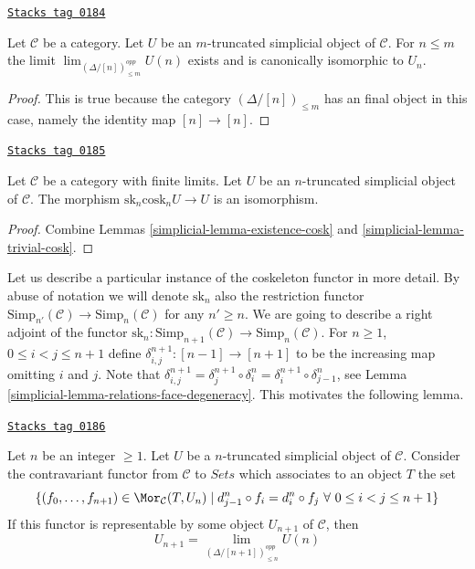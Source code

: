 \begin{lemma}
\label{simplicial-lemma-trivial-cosk}
\href{https://stacks.math.columbia.edu/tag/0184}{\texttt{Stacks tag 0184}}

Let $\mathcal{C}$ be a category.
Let $U$ be an $m$-truncated simplicial object of $\mathcal{C}$.
For $n \leq m$ the limit $\lim_{(\Delta/[n])_{\leq m}^{opp}} U(n)$
exists and is canonically isomorphic to $U_n$.
\end{lemma}

\begin{proof}
This is true because the category $(\Delta/[n])_{\leq m}$
has an final object in this case, namely the identity
map $[n] \to [n]$.
\end{proof}

\begin{lemma}
\label{simplicial-lemma-recover-cosk}
\href{https://stacks.math.columbia.edu/tag/0185}{\texttt{Stacks tag 0185}}

Let $\mathcal{C}$ be a category with finite limits.
Let $U$ be an $n$-truncated simplicial object of $\mathcal{C}$.
The morphism $\text{sk}_n \text{cosk}_n U \to U$
is an isomorphism.
\end{lemma}

\begin{proof}

Combine Lemmas \ref{simplicial-lemma-existence-cosk} and \ref{simplicial-lemma-trivial-cosk}.
\end{proof}

Let us describe a particular instance of the coskeleton functor in more detail.
By abuse of notation we will denote $\text{sk}_n$
also the restriction functor
$\text{Simp}_{n'}(\mathcal{C}) \to \text{Simp}_n(\mathcal{C})$
for any $n' \geq n$. We are going to describe a right adjoint
of the functor
$\text{sk}_n : \text{Simp}_{n + 1}(\mathcal{C})
\to \text{Simp}_n(\mathcal{C})$.
For $n \geq 1$, $0 \leq i < j \leq n + 1$
define $\delta^{n + 1}_{i, j} : [n - 1] \to [n + 1]$
to be the increasing map omitting $i$ and $j$.
Note that
$\delta^{n + 1}_{i, j} =
\delta^{n + 1}_j \circ \delta^n_i =
\delta^{n + 1}_i \circ \delta^n_{j - 1}$, see
Lemma \ref{simplicial-lemma-relations-face-degeneracy}. This motivates
the following lemma.

\begin{lemma}
\label{simplicial-lemma-formula-limit}
\href{https://stacks.math.columbia.edu/tag/0186}{\texttt{Stacks tag 0186}}

Let $n$ be an integer $\geq 1$.
Let $U$ be a $n$-truncated simplicial object of $\mathcal{C}$.
Consider the contravariant functor from $\mathcal{C}$ to
$\textit{Sets}$ which associates to an object $T$ the set
$$
\{ (f_0, \ldots, f_{n + 1}) \in \Mor_\mathcal{C}(T, U_n)
\mid
d^n_{j - 1} \circ f_i = d^n_i \circ f_j
\ \forall\ 0\leq i < j\leq n + 1\}
$$
If this functor is representable by some object $U_{n + 1}$
of $\mathcal{C}$, then
$$
U_{n + 1} = \lim_{(\Delta/[n + 1])_{\leq n}^{opp}} U(n)
$$
\end{lemma}

